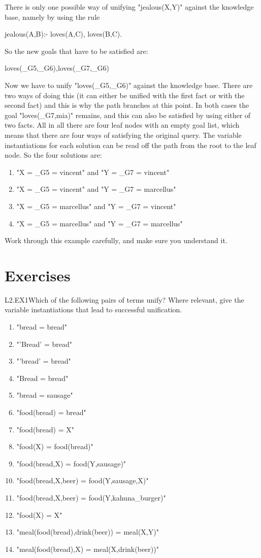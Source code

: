 There is only one possible way of unifying "jealous(X,Y)" against the
knowledge base, namely by using the rule
\begin{LPNcodedisplay}
jealous(A,B):- loves(A,C), loves(B,C).
\end{LPNcodedisplay}
%
So the new goals that have to be satisfied are:
\begin{LPNcodedisplay}
loves(_G5,_G6),loves(_G7,_G6)
\end{LPNcodedisplay}
Now we have to unify "loves(\_G5,\_G6)" against the knowledge base.
There are two ways of doing this (it can either be unified with the
first fact or with the second fact) and this is why the path branches
at this point. In both cases the goal "loves(\_G7,mia)" remains, and
this can also be satisfied by using  either of two facts.  All in
all there are four leaf nodes with an empty goal list, which means
that there are four ways of satisfying the original query. The
variable instantiations for each solution can be read off the path
from the root to the leaf node. So the four solutions are:
\begin{enumerate}
\item{}"X = \_G5 = vincent" and
"Y = \_G7 = vincent"
\item{}"X = \_G5 = vincent" and
"Y = \_G7 = marcellus"
\item{}"X = \_G5 = marcellus" and
"Y = \_G7 = vincent"
\item{}"X = \_G5 = marcellus" and
"Y = \_G7 = marcellus"
\end{enumerate}
Work through this example carefully, and make sure you understand it.

\section{Exercises}\label{SEC.L2.EXERCISES}

\begin{LPNexercise}{L2.EX1}Which of the following pairs of terms unify?
Where relevant, give the
variable instantiations that lead to successful unification.
\begin{enumerate}
\item{}"bread = bread"
\item{}"'Bread' = bread"
\item{}"'bread' = bread"
\item{}"Bread = bread"
\item{}"bread = sausage"
\item{}"food(bread) = bread"
\item{}"food(bread) = X"
\item{}"food(X) = food(bread)"
\item{}"food(bread,X) = food(Y,sausage)"
\item{}"food(bread,X,beer) = food(Y,sausage,X)"
\item{}"food(bread,X,beer) = food(Y,kahuna\_burger)"
\item{}"food(X) = X"
\item{}"meal(food(bread),drink(beer)) = meal(X,Y)"
\item{}"meal(food(bread),X) = meal(X,drink(beer))"
\end{enumerate}
\end{LPNexercise}

